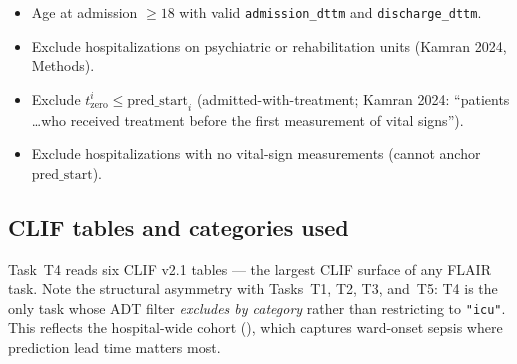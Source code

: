 \documentclass[11pt]{article}
\newcommand{\tzero}{t_{\text{zero}}}
\newcommand{\predstart}{\text{pred\_start}}
\begin{document}
\begin{itemize}[leftmargin=2em]
  \item Age at admission $\ge 18$ with valid \texttt{admission\_dttm}
        and \texttt{discharge\_dttm}.
  \item Exclude hospitalizations on psychiatric or rehabilitation
        units (Kamran 2024, Methods).
  \item Exclude $\tzero^i \le \predstart_i$ (admitted-with-treatment;
        Kamran 2024: ``patients \ldots who received treatment before the
        first measurement of vital signs'').
  \item Exclude hospitalizations with no vital-sign measurements
        (cannot anchor $\predstart$).
\end{itemize}

\subsection{CLIF tables and categories used}
\label{sec:t4-clif}

Task~T4 reads six CLIF v2.1 tables --- the largest CLIF surface of any
FLAIR task. Note the structural asymmetry with Tasks~T1, T2, T3, and~T5:
T4 is the only task whose ADT filter \emph{excludes by category} rather
than restricting to \texttt{"icu"}. This reflects the hospital-wide
cohort (\citealp{kamran2024sepsis}), which captures ward-onset sepsis
where prediction lead time matters most.
\end{document}

